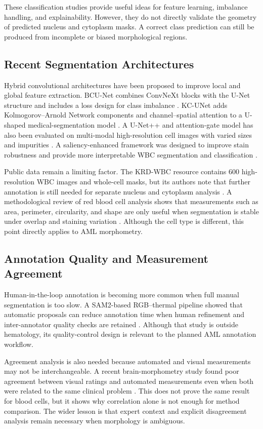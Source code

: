 \documentclass[pdflatex,sn-mathphys-num]{sn-jnl}%
\theoremstyle{thmstyleone}%
\theoremstyle{thmstyletwo}%
\theoremstyle{thmstylethree}%
\begin{document}
These classification studies provide useful ideas for feature learning, imbalance handling, and explainability. However, they do not directly validate the geometry of predicted nucleus and cytoplasm masks. A correct class prediction can still be produced from incomplete or biased morphological regions.

\subsection{Recent Segmentation Architectures}

Hybrid convolutional architectures have been proposed to improve local and global feature extraction. BCU-Net combines ConvNeXt blocks with the U-Net structure and includes a loss design for class imbalance \cite{39}. KC-UNet adds Kolmogorov--Arnold Network components and channel--spatial attention to a U-shaped medical-segmentation model \cite{40}. A U-Net++ and attention-gate model has also been evaluated on multi-modal high-resolution cell images with varied sizes and impurities \cite{41}. A saliency-enhanced framework was designed to improve stain robustness and provide more interpretable WBC segmentation and classification \cite{42}.

Public data remain a limiting factor. The KRD-WBC resource contains 600 high-resolution WBC images and whole-cell masks, but its authors note that further annotation is still needed for separate nucleus and cytoplasm analysis \cite{43}. A methodological review of red blood cell analysis shows that measurements such as area, perimeter, circularity, and shape are only useful when segmentation is stable under overlap and staining variation \cite{44}. Although the cell type is different, this point directly applies to AML morphometry.

\subsection{Annotation Quality and Measurement Agreement}

Human-in-the-loop annotation is becoming more common when full manual segmentation is too slow. A SAM2-based RGB--thermal pipeline showed that automatic proposals can reduce annotation time when human refinement and inter-annotator quality checks are retained \cite{45}. Although that study is outside hematology, its quality-control design is relevant to the planned AML annotation workflow.

Agreement analysis is also needed because automated and visual measurements may not be interchangeable. A recent brain-morphometry study found poor agreement between visual ratings and automated measurements even when both were related to the same clinical problem \cite{46}. This does not prove the same result for blood cells, but it shows why correlation alone is not enough for method comparison. The wider lesson is that expert context and explicit disagreement analysis remain necessary when morphology is ambiguous.
\end{document}
